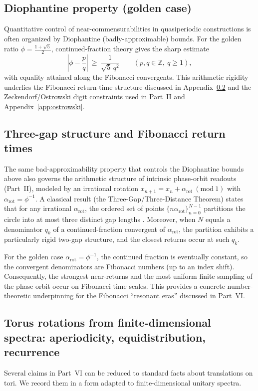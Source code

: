 \subsection{Diophantine property (golden case)}
Quantitative control of near-commensurabilities in quasiperiodic constructions is often organized by Diophantine (badly-approximable) bounds. For the golden ratio $\phi=\tfrac{1+\sqrt5}{2}$, continued-fraction theory gives the sharp estimate \cite{Cassels1957Diophantine}
\begin{equation}
    \left| \phi - \frac{p}{q} \right|\ \ge\ \frac{1}{\sqrt{5}\,q^2}\qquad (p,q\in\mathbb{Z},\ q\ge 1),
\end{equation}
with equality attained along the Fibonacci convergents. This arithmetic rigidity underlies the Fibonacci return-time structure discussed in Appendix~\ref{app:three_gap} and the Zeckendorf/Ostrowski digit constraints used in Part~II and Appendix~\ref{app:ostrowski}.

\subsection{Three-gap structure and Fibonacci return times}
\label{app:three_gap}
The same bad-approximability property that controls the Diophantine bounds above also governs the arithmetic structure of intrinsic phase-orbit readouts (Part~II), modeled by an irrational rotation $x_{n+1}=x_n+\alpha_{\mathrm{rot}}\ (\mathrm{mod}\ 1)$ with $\alpha_{\mathrm{rot}}=\phi^{-1}$. A classical result (the Three-Gap/Three-Distance Theorem) states that for any irrational $\alpha_{\mathrm{rot}}$, the ordered set of points $\{n\alpha_{\mathrm{rot}}\}_{n=0}^{N-1}$ partitions the circle into at most three distinct gap lengths \cite{Slater1967}.
Moreover, when $N$ equals a denominator $q_k$ of a continued-fraction convergent of $\alpha_{\mathrm{rot}}$, the partition exhibits a particularly rigid two-gap structure, and the closest returns occur at such $q_k$.

For the golden case $\alpha_{\mathrm{rot}}=\phi^{-1}$, the continued fraction is eventually constant, so the convergent denominators are Fibonacci numbers (up to an index shift). Consequently, the strongest near-returns and the most uniform finite sampling of the phase orbit occur on Fibonacci time scales. This provides a concrete number-theoretic underpinning for the Fibonacci ``resonant eras'' discussed in Part~VI.

\subsection{Torus rotations from finite-dimensional spectra: aperiodicity, equidistribution, recurrence}
\label{app:torus_rotation}
Several claims in Part~VI can be reduced to standard facts about translations on tori. We record them in a form adapted to finite-dimensional unitary spectra.

